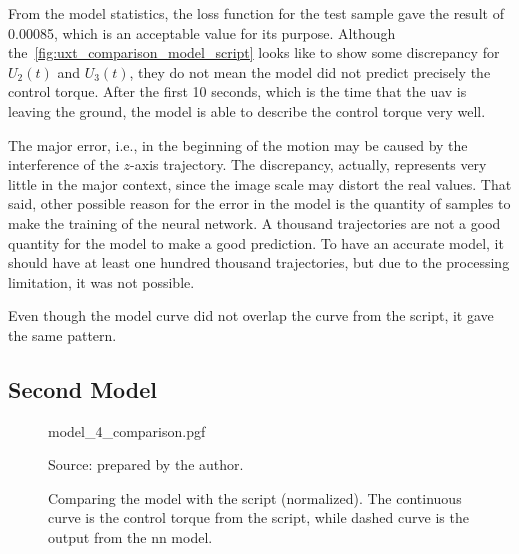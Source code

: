 From the model statistics, the loss function for the test sample gave the result of 0.00085, which is an acceptable value for its purpose.
Although the~\cref{fig:uxt_comparison_model_script} looks like to show some discrepancy for \(U_2(t)\) and \(U_3(t)\), they do not mean the model did not predict precisely the control torque. 
After the first 10 seconds, which is the time that the \gls*{uav} is leaving the ground, the model is able to describe the control torque very well.

The major error, i.e., in the beginning of the motion may be caused by the interference of the \(z\)-axis trajectory. 
The discrepancy, actually, represents very little in the major context, since the image scale may distort the real values.
That said, other possible reason for the error in the model is the quantity of samples to make the training of the neural network. 
A thousand trajectories are not a good quantity for the model to make a good prediction.
To have an accurate model, it should have at least one hundred thousand trajectories, but due to the processing limitation, it was not possible.

Even though the model curve did not overlap the curve from the script, it gave the same pattern.

\subsection{Second Model}

\begin{figure}[!htb]
    \centering
    \caption[Comparing the model with the script(normalized)]{Comparing the model with the script (normalized). The continuous curve is the control torque from the script, while dashed curve is the output from the \gls*{nn} model.}
    {model_4_comparison.pgf}

    {\footnotesize Source: prepared by the author.}
    \label{fig:model_4_comparison}
\end{figure}
